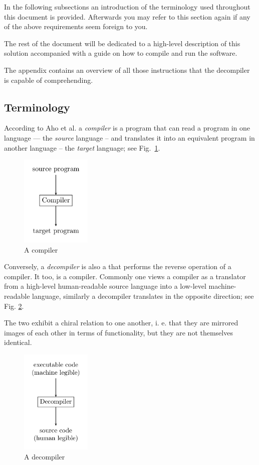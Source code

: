\documentclass[a4paper]{article}
\begin{document}
In the following subsections an introduction of the terminology used
throughout this document is provided. Afterwards you may refer to this
section again if any of the above requirements seem foreign to you.

The rest of the document will be dedicated to a high-level description
of this solution accompanied with a guide on how to compile and run
the software.

The appendix contains an overview of all those instructions that the
decompiler is capable of comprehending.
\subsection{Terminology}

According to Aho et al.  a \emph{compiler} is a program that
can read a program in one language --- the \emph{source} language --
and translates it into an equivalent program in another language --
the \emph{target} language; see Fig.~\ref{fig:compiler}.

\begin{figure}[H]
  \centering
  \includegraphics[width=0.3\textwidth]{figures/compiler.png}
  \caption{A compiler}
  \label{fig:compiler}
\end{figure}

Conversely, a \emph{decompiler} is also a that performs the reverse
operation of a compiler. It too, is a compiler. Commonly one views a
compiler as a translator from a high-level human-readable source
language into a low-level machine-readable language, similarly a
decompiler translates in the opposite direction; see
Fig. \ref{fig:decompiler}. 

The two exhibit a chiral relation to one another, i. e. that they are
mirrored images of each other in terms of functionality, but they are
not themselves identical.

\begin{figure}[H]
  \centering
  \includegraphics[width=0.3\textwidth]{figures/decompiler.png}
  \caption{A decompiler}
  \label{fig:decompiler}
\end{figure}
\end{document}
